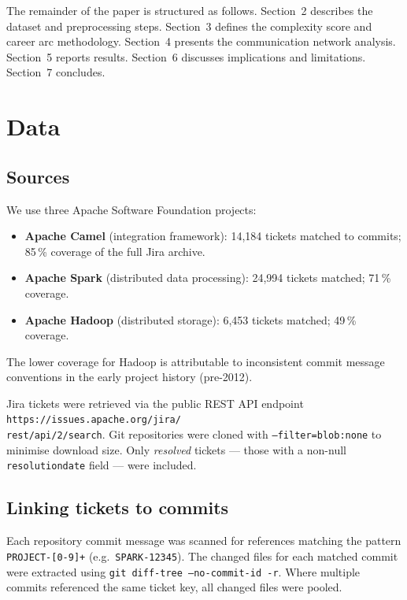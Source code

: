 \documentclass[12pt,a4paper]{article}
\begin{document}
The remainder of the paper is structured as follows. Section~2
describes the dataset and preprocessing steps. Section~3 defines
the complexity score and career arc methodology. Section~4 presents
the communication network analysis. Section~5 reports results.
Section~6 discusses implications and limitations. Section~7 concludes.

\section{Data}

\subsection{Sources}

We use three Apache Software Foundation projects:

\begin{itemize}
  \item \textbf{Apache Camel} (integration framework): 14,184 tickets
    matched to commits; 85\,\% coverage of the full Jira archive.
  \item \textbf{Apache Spark} (distributed data processing): 24,994
    tickets matched; 71\,\% coverage.
  \item \textbf{Apache Hadoop} (distributed storage): 6,453 tickets
    matched; 49\,\% coverage.
\end{itemize}

The lower coverage for Hadoop is attributable to inconsistent
commit message conventions in the early project history (pre-2012).

Jira tickets were retrieved via the public REST API endpoint
\texttt{https://issues.apache.org/jira/\\rest/api/2/search}.
Git repositories were cloned with \texttt{--filter=blob:none} to
minimise download size. Only \textit{resolved} tickets --- those
with a non-null \texttt{resolutiondate} field --- were included.

\subsection{Linking tickets to commits}

Each repository commit message was scanned for references matching
the pattern \texttt{PROJECT-[0-9]+} (e.g.\ \texttt{SPARK-12345}).
The changed files for each matched commit were extracted using
\texttt{git diff-tree --no-commit-id -r}.
Where multiple commits referenced the same ticket key, all changed
files were pooled.
\end{document}

